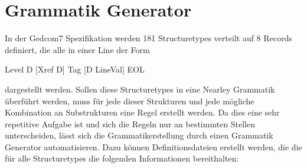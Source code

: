 \section{Grammatik Generator}
\label{sec: Konzept - Grammatik Generator}
In der Gedcom7 Spezifikation werden 181 Structuretypes verteilt auf 8 Records definiert, die alle in einer Line der Form
\begin{center}
	Level  D  [Xref  D]  Tag  [D  LineVal]  EOL
\end{center}
dargestellt werden. Sollen diese Structuretypes in eine Nearley Grammatik überführt werden, muss für jede dieser Strukturen und jede mögliche Kombination an Substrukturen eine Regel erstellt werden. Da dies eine sehr repetitive Aufgabe ist und sich die Regeln nur an bestimmten Stellen unterscheiden, lässt sich die Grammatikerstellung durch einen Grammatik Generator automatisieren. Dazu können Definitionsdateien erstellt werden, die die für alle Structuretypes die folgenden Informationen bereithalten: 
